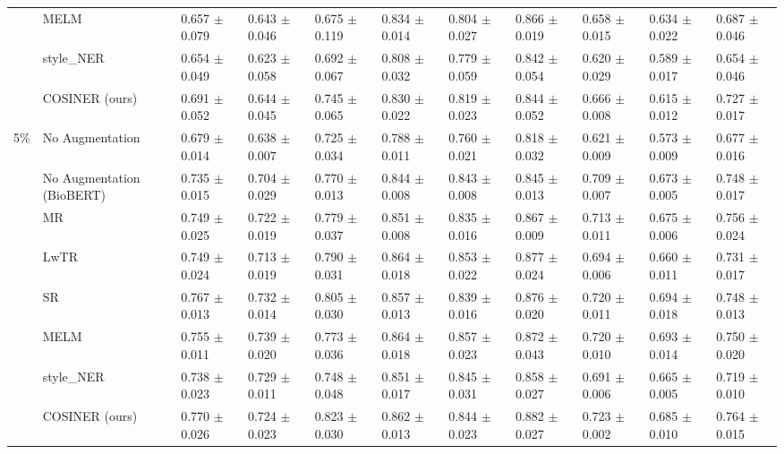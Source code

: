 \begin{table}
{{\begin{tabular}{cllll|lll|lll}
&MELM & 0.657 $\pm$ 0.079 & 0.643 $\pm$ 0.046 & 0.675 $\pm$ 0.119 & 0.834 $\pm$ 0.014 & 0.804 $\pm$ 0.027 & 0.866 $\pm$ 0.019 & 0.658 $\pm$ 0.015 & 0.634 $\pm$ 0.022 & 0.687 $\pm$ 0.046 \\
&style\_NER & 0.654 $\pm$ 0.049 & 0.623 $\pm$ 0.058 & 0.692 $\pm$ 0.067 & 0.808 $\pm$ 0.032 & 0.779 $\pm$ 0.059 & 0.842 $\pm$ 0.054 & 0.620 $\pm$ 0.029 & 0.589 $\pm$ 0.017 & 0.654 $\pm$ 0.046 \\
&COSINER (ours) & 0.691 $\pm$ 0.052 & 0.644 $\pm$ 0.045 & 0.745 $\pm$ 0.065 & 0.830 $\pm$ 0.022 & 0.819 $\pm$ 0.023 & 0.844 $\pm$ 0.052 & 0.666 $\pm$ 0.008 & 0.615 $\pm$ 0.012 & 0.727 $\pm$ 0.017 \\
\midrule
\multirow{8}{*}{5\%} & No Augmentation & 0.679 $\pm$ 0.014 & 0.638 $\pm$ 0.007 & 0.725 $\pm$ 0.034 & 0.788 $\pm$ 0.011 & 0.760 $\pm$ 0.021 & 0.818 $\pm$ 0.032 & 0.621 $\pm$ 0.009 & 0.573 $\pm$ 0.009 & 0.677 $\pm$ 0.016 \\
&No Augmentation (BioBERT) & 0.735 $\pm$ 0.015 & 0.704 $\pm$ 0.029 & 0.770 $\pm$ 0.013 & 0.844 $\pm$ 0.008 & 0.843 $\pm$ 0.008 & 0.845 $\pm$ 0.013 & 0.709 $\pm$ 0.007 & 0.673 $\pm$ 0.005 & 0.748 $\pm$ 0.017 \\
&MR & 0.749 $\pm$ 0.025 & 0.722 $\pm$ 0.019 & 0.779 $\pm$ 0.037 & 0.851 $\pm$ 0.008 & 0.835 $\pm$ 0.016 & 0.867 $\pm$ 0.009 & 0.713 $\pm$ 0.011 & 0.675 $\pm$ 0.006 & 0.756 $\pm$ 0.024 \\
&LwTR & 0.749 $\pm$ 0.024 & 0.713 $\pm$ 0.019 & 0.790 $\pm$ 0.031 & 0.864 $\pm$ 0.018 & 0.853 $\pm$ 0.022 & 0.877 $\pm$ 0.024 & 0.694 $\pm$ 0.006 & 0.660 $\pm$ 0.011 & 0.731 $\pm$ 0.017 \\
&SR & 0.767 $\pm$ 0.013 & 0.732 $\pm$ 0.014 & 0.805 $\pm$ 0.030 & 0.857 $\pm$ 0.013 & 0.839 $\pm$ 0.016 & 0.876 $\pm$ 0.020 & 0.720 $\pm$ 0.011 & 0.694 $\pm$ 0.018 & 0.748 $\pm$ 0.013 \\
&MELM & 0.755 $\pm$ 0.011 & 0.739 $\pm$ 0.020 & 0.773 $\pm$ 0.036 & 0.864 $\pm$ 0.018 & 0.857 $\pm$ 0.023 & 0.872 $\pm$ 0.043 & 0.720 $\pm$ 0.010 & 0.693 $\pm$ 0.014 & 0.750 $\pm$ 0.020 \\
&style\_NER & 0.738 $\pm$ 0.023 & 0.729 $\pm$ 0.011 & 0.748 $\pm$ 0.048 & 0.851 $\pm$ 0.017 & 0.845 $\pm$ 0.031 & 0.858 $\pm$ 0.027 & 0.691 $\pm$ 0.006 & 0.665 $\pm$ 0.005 & 0.719 $\pm$ 0.010 \\
&COSINER (ours) & 0.770 $\pm$ 0.026 & 0.724 $\pm$ 0.023 & 0.823 $\pm$ 0.030 & 0.862 $\pm$ 0.013 & 0.844 $\pm$ 0.023 & 0.882 $\pm$ 0.027 & 0.723 $\pm$ 0.002 & 0.685 $\pm$ 0.010 & 0.764 $\pm$ 0.015 \\

\end{tabular}}}
\end{table}

